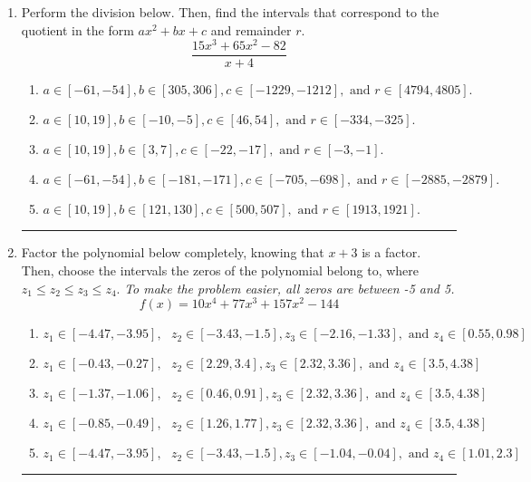 \documentclass[14pt]{extbook}
\newcommand{\litem}[1]{\item#1\hspace*{-1cm}\rule{\textwidth}{0.4pt}}
\begin{document}
\begin{enumerate}
{\begin{enumerate}[label=\Alph*.]
\end{enumerate} }
\litem{
Perform the division below. Then, find the intervals that correspond to the quotient in the form $ax^2+bx+c$ and remainder $r$.\[ \frac{15x^{3} +65 x^{2} -82}{x + 4} \]\begin{enumerate}[label=\Alph*.]
\item \( a \in [-61, -54], b \in [305, 306], c \in [-1229, -1212], \text{ and } r \in [4794, 4805]. \)
\item \( a \in [10, 19], b \in [-10, -5], c \in [46, 54], \text{ and } r \in [-334, -325]. \)
\item \( a \in [10, 19], b \in [3, 7], c \in [-22, -17], \text{ and } r \in [-3, -1]. \)
\item \( a \in [-61, -54], b \in [-181, -171], c \in [-705, -698], \text{ and } r \in [-2885, -2879]. \)
\item \( a \in [10, 19], b \in [121, 130], c \in [500, 507], \text{ and } r \in [1913, 1921]. \)

\end{enumerate} }
\litem{
Factor the polynomial below completely, knowing that $x+3$ is a factor. Then, choose the intervals the zeros of the polynomial belong to, where $z_1 \leq z_2 \leq z_3 \leq z_4$. \textit{To make the problem easier, all zeros are between -5 and 5.}\[ f(x) = 10x^{4} +77 x^{3} +157 x^{2} -144 \]\begin{enumerate}[label=\Alph*.]
\item \( z_1 \in [-4.47, -3.95], \text{   }  z_2 \in [-3.43, -1.5], z_3 \in [-2.16, -1.33], \text{   and   } z_4 \in [0.55, 0.98] \)
\item \( z_1 \in [-0.43, -0.27], \text{   }  z_2 \in [2.29, 3.4], z_3 \in [2.32, 3.36], \text{   and   } z_4 \in [3.5, 4.38] \)
\item \( z_1 \in [-1.37, -1.06], \text{   }  z_2 \in [0.46, 0.91], z_3 \in [2.32, 3.36], \text{   and   } z_4 \in [3.5, 4.38] \)
\item \( z_1 \in [-0.85, -0.49], \text{   }  z_2 \in [1.26, 1.77], z_3 \in [2.32, 3.36], \text{   and   } z_4 \in [3.5, 4.38] \)
\item \( z_1 \in [-4.47, -3.95], \text{   }  z_2 \in [-3.43, -1.5], z_3 \in [-1.04, -0.04], \text{   and   } z_4 \in [1.01, 2.3] \)


\end{enumerate}}
\end{enumerate}
\end{document}

